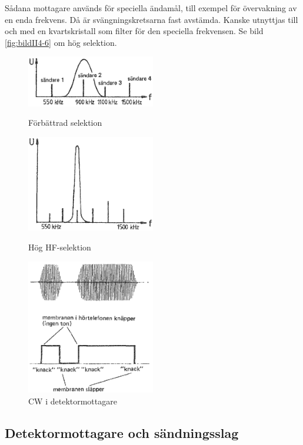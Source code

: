 Sådana mottagare används för speciella ändamål, till exempel för övervakning
av en enda frekvens.
Då är svängningskretsarna fast avstämda.
Kanske utnyttjas till och med en kvartskristall som filter för den speciella
frekvensen.
Se bild \ref{fig:bildII4-6} om hög selektion.

\begin{figure}
  \includegraphics[width=0.5\textwidth]{images/cropped_pdfs/bild_2_4-04.pdf}
  \caption{Förbättrad selektion}
  \label{fig:bildII4-4}

  \includegraphics[width=0.5\textwidth]{images/cropped_pdfs/bild_2_4-06.pdf}
  \caption{Hög HF-selektion}
  \label{fig:bildII4-6}

  \includegraphics[width=0.5\textwidth]{images/cropped_pdfs/bild_2_4-07.pdf}
  \caption{CW i detektormottagare}
  \label{fig:bildII4-7}
\end{figure}

\subsection{Detektormottagare och sändningsslag}

